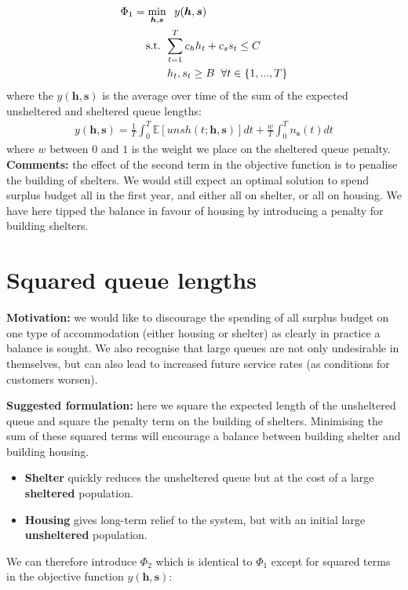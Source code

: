 \documentclass{article}
\begin{document}
\begin{align*}
        & \Phi_1 = \min_{\boldsymbol{h},\boldsymbol{s}} \hspace{0.2cm} y(\boldsymbol{h},\boldsymbol{s}) \\
        & \hspace{0.7cm} \text{ s.t. } \sum_{t=1}^{T} c_{h}h_{t} + c_{s}s_{t} \leq C \\
        & \hspace{1.5cm} h_t, s_t \geq B \hspace{0.2cm} \forall t \in \{1, ..., T\}
\end{align*}
%
where the $y(\boldsymbol{h},\boldsymbol{s})$ is the average over time of the sum of the expected unsheltered and sheltered queue lengths: 
\begin{align*}
  y(\boldsymbol{h},\boldsymbol{s}) = \frac{1}{T} \int_0^T \mathbb{E}[unsh(t; \boldsymbol{h},\boldsymbol{s})] dt + \frac{w}{T} \int_0^T n_{\boldsymbol{s}}(t) dt
\end{align*}
%
where $w$ between $0$ and $1$ is the weight we place on the sheltered queue penalty.  \newline
%
\textbf{Comments:} the effect of the second term in the objective function is to penalise the building of shelters. We would still expect an optimal solution to spend surplus budget all in the first year, and either all on shelter, or all on housing. We have here tipped the balance in favour of housing by introducing a penalty for building shelters. 

\newpage

\section{Squared queue lengths}

\textbf{Motivation:} we would like to discourage the spending of all surplus budget on one type of accommodation (either housing or shelter) as clearly in practice a balance is sought. We also recognise that large queues are not only undesirable in themselves, but can also lead to increased future service rates (as conditions for customers worsen). \par
%
\textbf{Suggested formulation:} here we square the expected length of the unsheltered queue and square the penalty term on the building of shelters. Minimising the sum of these squared terms will encourage a balance between building shelter and building housing.
%
\begin{itemize}[noitemsep]
\item \textbf{Shelter} quickly reduces the unsheltered queue but at the cost of a large \textbf{sheltered} population.
\item \textbf{Housing} gives long-term relief to the system, but with an initial large \textbf{unsheltered} population. 
\end{itemize}
%
We can therefore introduce $\Phi_2$ which is identical to $\Phi_1$ except for squared terms in the objective function $y(\boldsymbol{h},\boldsymbol{s})$: 
\end{document}

